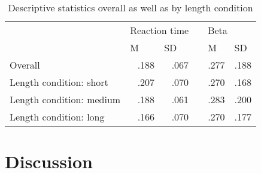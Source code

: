 \documentclass[man]{apa6} %
\begin{document}
\begin{table}[ht]
  \caption{Descriptive statistics overall as well as by length condition}
  \centering
  \begin{tabular}{lrrrrr}
    \toprule
                              & \multicolumn{2}{l}{Reaction time}              && \multicolumn{2}{l}{Beta}                       \\ \cmidrule{2-3} \cmidrule{5-6}
                              & \multicolumn{1}{l}{M} & \multicolumn{1}{l}{SD} && \multicolumn{1}{l}{M} & \multicolumn{1}{l}{SD} \\
    \midrule
    Overall                   & .188                  &  .067                  && .277                  & .188                   \\
    Length condition: short   & .207                  &  .070                  && .270                  & .168                   \\
    Length condition: medium  & .188                  &  .061                  && .283                  & .200                   \\
    Length condition: long    & .166                  &  .070                  && .270                  & .177                   \\
    \bottomrule
  \end{tabular}
\end{table}

\section{Discussion}




\end{document}
